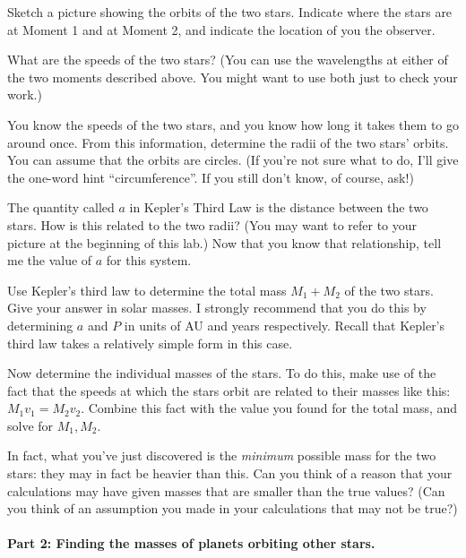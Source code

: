 Sketch a picture showing the orbits of the two stars. Indicate
where the stars are at Moment 1 and at Moment 2, and indicate the location
of you the observer.

\vfil\eject

What are the speeds of the two stars? (You can use the wavelengths
at either of the two moments described above. You might want to use
both just to check your work.)

\vskip 2in

You know the speeds of the two stars, and you know how long it takes
them to go around once. From this information, determine the radii
of the two stars' orbits. You can assume that the orbits are circles.
(If you're not sure what to do, I'll give the one-word hint
``circumference''. If you still don't know, of course, ask!)

\vskip 2in

The quantity called $a$ in Kepler's Third Law is the distance between
the two stars. How is this related to the two radii? (You may
want to refer to your picture at the beginning of this lab.) Now that you know
that relationship, tell me the value of $a$ for this system.

\vskip 2in

Use Kepler's third law to determine the total mass $M_1+M_2$ of the
two stars. Give your answer in solar masses. I strongly recommend
that you do this by determining $a$ and $P$ in units of AU and years
respectively. Recall that Kepler's third law takes a relatively simple
form in this case.

\vskip 3in

Now determine the individual masses of the stars. To do this, make
use of the fact that the speeds at which the stars orbit
are related to their masses like this: $M_1v_1=M_2v_2$. Combine
this fact with the value you found for the total mass, and solve for
$M_1,M_2$.

\vskip 2in

In fact, what you've just discovered is the \textit{minimum} possible
mass for the two stars: they may in fact be heavier than this.
Can you think of a reason that your calculations may have given
masses that are smaller than the true values? (Can you think of an
assumption you made in your calculations that may not be true?)

\vskip 1in

\paragraph{Part 2: Finding the masses of planets orbiting other stars.}

